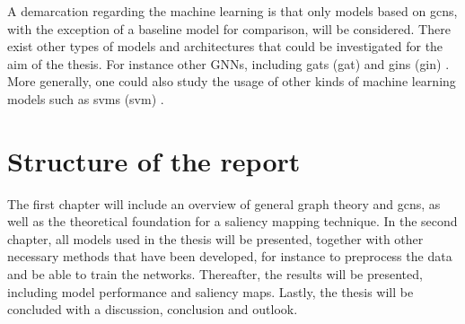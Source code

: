 A demarcation regarding the machine learning is that only models based on \acrshort{gcn}s, with the exception of a baseline model for comparison, will be considered. There exist other types of models and architectures that could be investigated for the aim of the thesis. For instance other GNNs, including \acrlong{gat}s (\acrshort{gat}) \cite{gat} and \acrlong{gin}s (\acrshort{gin}) \cite{gin}. More generally, one could also  study the usage of other kinds of machine learning models such as \acrlong{svm}s (\acrshort{svm}) \cite{neuro_ml}.


\section{Structure of the report}
The first chapter will include an overview of general graph theory and \acrlong{gcn}s, as well as the theoretical foundation for a saliency mapping technique. In the second chapter, all models used in the thesis will be presented, together with other necessary methods that have been developed, for instance to preprocess the data and be able to train the networks. Thereafter, the results will be presented, including model performance and saliency maps. Lastly, the thesis will be concluded with a discussion, conclusion and outlook. 